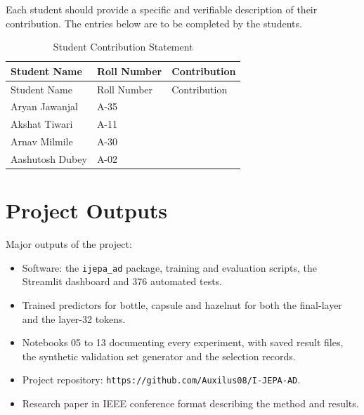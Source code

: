 \documentclass[12pt,a4paper,oneside]{report}
\begin{document}
Each student should provide a specific and verifiable description of their
contribution. The entries below are to be completed by the students.

\begin{longtable}{p{}p{}p{}}
\caption{Student Contribution Statement}\\
\toprule
Student Name & Roll Number & Contribution\\
\midrule
\endfirsthead
\toprule
Student Name & Roll Number & Contribution\\
\midrule
\endhead
Aryan Jawanjal & A-35 & \\
Akshat Tiwari & A-11 & \\
Arnav Milmile & A-30 & \\
Aashutosh Dubey & A-02 & \\
\bottomrule
\end{longtable}

\chapter{Project Outputs}

Major outputs of the project:

\begin{itemize}
    \item Software: the \texttt{ijepa\_ad} package, training and evaluation
    scripts, the Streamlit dashboard and 376 automated tests.
    \item Trained predictors for bottle, capsule and hazelnut for both the
    final-layer and the layer-32 tokens.
    \item Notebooks 05 to 13 documenting every experiment, with saved result
    files, the synthetic validation set generator and the selection records.
    \item Project repository: \texttt{https://github.com/Auxilus08/I-JEPA-AD}.
    \item Research paper in IEEE conference format describing the method and
    results.
\end{itemize}

\end{document}
